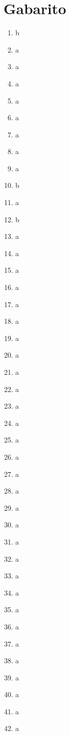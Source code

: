 \documentclass[12pt,a4paper]{article}
\begin{document}
\newpage

\section*{Gabarito}

\begin{multicols}{2}

\begin{enumerate}[label=\textbf{Q\arabic*.}]
    \item b
    \item a
    \item a
    \item a
    \item a
    \item a
    \item a
    \item a
    \item a
    \item b
    \item a
    \item b
    \item a
    \item a
    \item a
    \item a
    \item a
    \item a
    \item a
    \item a
    \item a
    \item a
    \item a
    \item a
    \item a
    \item a
    \item a
    \item a
    \item a
    \item a
    \item a
    \item a
    \item a
    \item a
    \item a
    \item a
    \item a
    \item a
    \item a
    \item a
    \item a
    \item a

\end{enumerate}
\end{multicols}
\end{document}
